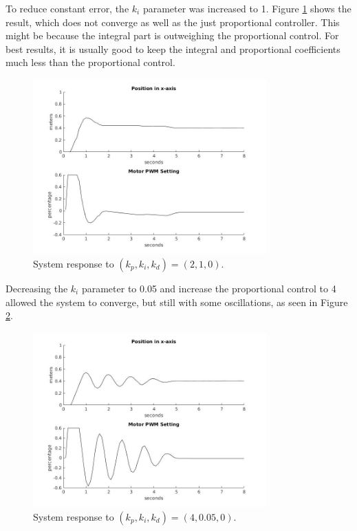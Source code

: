 \documentclass{journal}
\begin{document}
To reduce constant error, the $k_i$ parameter was increased to 1.  Figure \ref{fig:Lab1_p2i1d0} shows the result, which does not converge as well as the just proportional controller.  This might be because the integral part is outweighing the proportional control.  For best results, it is usually good to keep the integral and proportional coefficients much less than the proportional control.

\begin{figure}[H]
	\centering
	\includegraphics[width = 0.8\textwidth]{NickPhamgraphs/p2i1d0.jpg}
	\caption{System response to $(k_p, k_i, k_d) = (2, 1, 0)$.}
	\label{fig:Lab1_p2i1d0}
\end{figure}

Decreasing the $k_i$ parameter to 0.05 and increase the proportional control to 4 allowed the system to converge, but still with some oscillations, as seen in Figure \ref{fig:Lab1_p4i0_05d0}.

\begin{figure}[H]
	\centering
	\includegraphics[width = 0.8\textwidth]{NickPhamgraphs/p4i0_05d0.jpg}
	\caption{System response to $(k_p, k_i, k_d) = (4, 0.05, 0)$.}
	\label{fig:Lab1_p4i0_05d0}
\end{figure}
\end{document}
